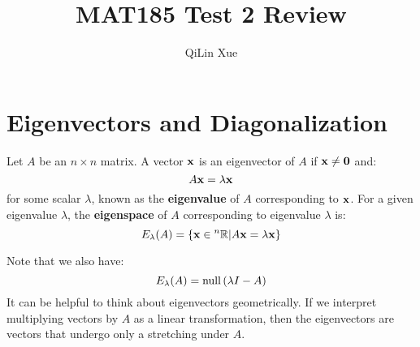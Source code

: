 \documentclass{article}
\title{MAT185 Test 2 Review}
\author{QiLin Xue}
\begin{document}
    \maketitle
    \tableofcontents
    \section{Eigenvectors and Diagonalization}
    \begin{definition}
        Let $A$ be an $n\times n$ matrix. A vector $\mathbf{x}$ is an eigenvector of $A$ if $\mathbf{x} \neq \mathbf{0}$ and:
        \begin{equation}
            A\mathbf{x} = \lambda\mathbf{x}
        \end{equation}
        for some scalar $\lambda$, known as the \textbf{eigenvalue} of $A$ corresponding to $\mathbf{x}$. For a given eigenvalue $\lambda$, the \textbf{eigenspace} of $A$ corresponding to eigenvalue $\lambda$ is:
        \begin{equation}
            E_\lambda(A) = \{\mathbf{x} \in {^n}\mathbb{R} | A\mathbf{x} = \lambda \mathbf{x}\}
        \end{equation}
    \end{definition}
    Note that we also have:
    \begin{equation}
        E_\lambda(A) = \mathrm{null}\,(\lambda I - A)
    \end{equation}
    It can be helpful to think about eigenvectors geometrically. If we interpret multiplying vectors by $A$ as a linear transformation, then the eigenvectors are vectors that undergo only a stretching under $A$. 
    
\end{document}
